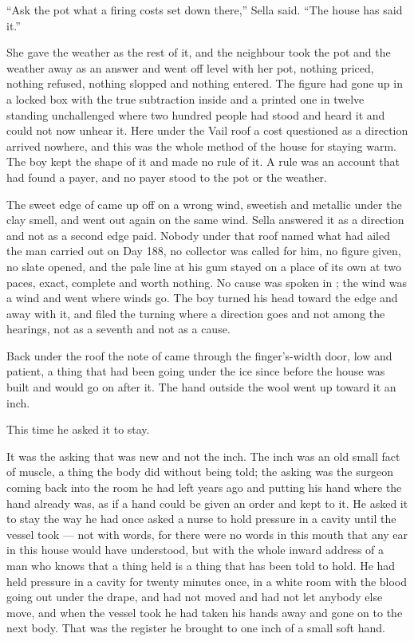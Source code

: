 “Ask the pot what a firing costs set down there,” Sella said. “The house has said it.”

She gave the weather as the rest of it, and the neighbour took the pot and the weather away as an answer and went off level with her pot, nothing priced, nothing refused, nothing slopped and nothing entered. The figure had gone up  in a locked box with the true subtraction inside and a printed one in twelve standing unchallenged where two hundred people had stood and heard it and could not now unhear it. Here under the Vail roof a cost questioned as a direction arrived nowhere, and this was the whole method of the house for staying warm. The boy kept the shape of it and made no rule of it. A rule was an account that had found a payer, and no payer stood to the pot or the weather.

The sweet edge of  came up off  on a wrong wind, sweetish and metallic under the clay smell, and went out again on the same wind. Sella answered it as a direction and not as a second edge paid. Nobody under that roof named what had ailed the man carried out on Day 188, no collector was called for him, no figure given, no slate opened, and the pale line at his gum stayed on a place of its own at two paces, exact, complete and worth nothing. No cause was spoken in ; the wind was a wind and went where winds go. The boy turned his head toward the edge and away with it, and filed the turning where a direction goes and not among the hearings, not as a seventh and not as a cause.

\scenebreak

Back under the roof the note of  came through the finger's-width door, low and patient, a thing that had been going under the ice since before the house was built and would go on after it. The hand outside the wool went up toward it an inch.

This time he asked it to stay.

It was the asking that was new and not the inch. The inch was an old small fact of muscle, a thing the body did without being told; the asking was the surgeon coming back into the room he had left years ago and putting his hand where the hand already was, as if a hand could be given an order and kept to it. He asked it to stay the way he had once asked a nurse to hold pressure in a cavity until the vessel took --- not with words, for there were no words in this mouth that any ear in this house would have understood, but with the whole inward address of a man who knows that a thing held is a thing that has been told to hold. He had held pressure in a cavity for twenty minutes once, in a white room with the blood going out under the drape, and had not moved and had not let anybody else move, and when the vessel took he had taken his hands away and gone on to the next body. That was the register he brought to one inch of a small soft hand.

